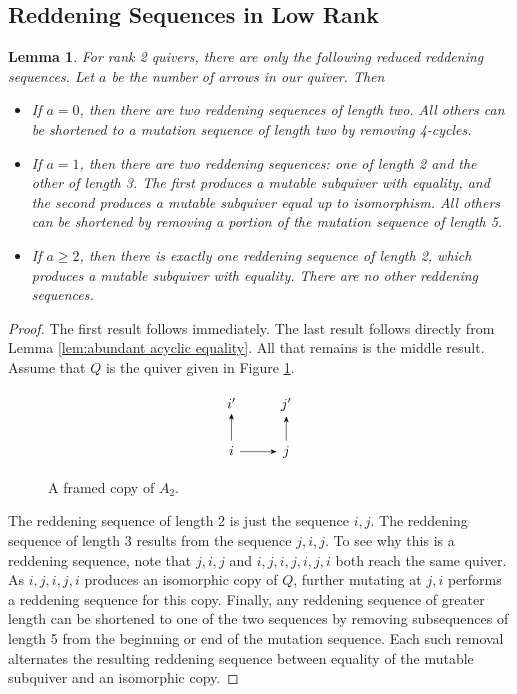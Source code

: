 \documentclass[11pt, letterpaper]{amsart}
\newtheorem{lemma}[theorem]{Lemma}
\theoremstyle{definition}
\numberwithin{equation}{section}
\begin{document}
\subsection{Reddening Sequences in Low Rank}

\begin{lemma} \label{lem:reddening sequences rank 2}
    For rank 2 quivers, there are only the following reduced reddening sequences. 
    Let $a$ be the number of arrows in our quiver. 
    Then
    \begin{itemize}
        \item If $a = 0$, then there are two reddening sequences of length two.
        All others can be shortened to a mutation sequence of length two by removing 4-cycles.

        \item If $a = 1$, then there are two reddening sequences: one of length 2 and the other of length 3.
        The first produces a mutable subquiver with equality, and the second produces a mutable subquiver equal up to isomorphism.
        All others can be shortened by removing a portion of the mutation sequence of length 5.

        \item If $a \geq 2$, then there is exactly one reddening sequence of length 2, which produces a mutable subquiver with equality.
        There are no other reddening sequences.
    \end{itemize}
\end{lemma}

\begin{proof}
    The first result follows immediately.
    The last result follows directly from Lemma \ref{lem:abundant acyclic equality}.
    All that remains is the middle result.
    Assume that $Q$ is the quiver given in Figure \ref{fig:framed a2}.
    
    \begin{figure}[ht]
        \centering
        \[\begin{tikzcd}[every arrow/.append style = {-{Stealth}}]
            i' & j' \\
            i & j
            \arrow[from=2-1,to=2-2]
            \arrow[from=2-1,to=1-1]
            \arrow[from=2-2,to=1-2]
        \end{tikzcd}\]
        \caption{A framed copy of $A_2$.}
        \label{fig:framed a2}
    \end{figure}
    
    The reddening sequence of length 2 is just the sequence $i,j$.
    The reddening sequence of length 3 results from the sequence $j,i,j$.
    To see why this is a reddening sequence, note that $j,i,j$ and $i,j,i,j,i,j,i$ both reach the same quiver.
    As $i,j,i,j,i$ produces an isomorphic copy of $Q$, further mutating at $j,i$ performs a reddening sequence for this copy.
    Finally, any reddening sequence of greater length can be shortened to one of the two sequences by removing subsequences of length 5 from the beginning or end of the mutation sequence.
    Each such removal alternates the resulting reddening sequence between equality of the mutable subquiver and an isomorphic copy.
\end{proof}
\end{document}
